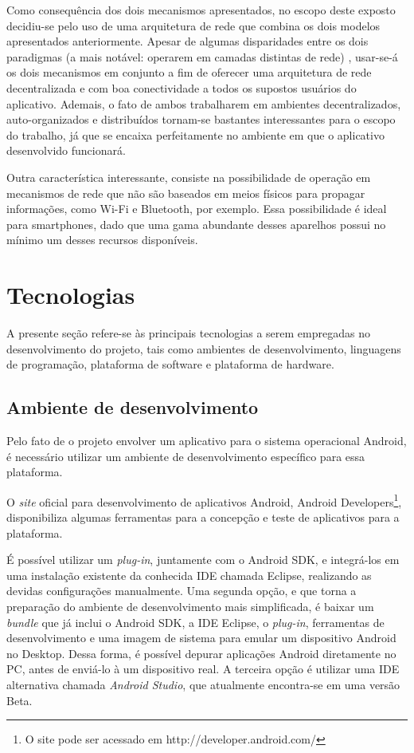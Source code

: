 Como consequência dos dois mecanismos apresentados, no escopo deste exposto decidiu-se pelo uso de uma arquitetura de rede que combina os dois modelos apresentados anteriormente. Apesar de algumas disparidades entre os dois paradigmas (a mais notável: operarem em camadas distintas de rede) \cite{italianos}, usar-se-á os dois mecanismos em conjunto a fim de oferecer uma arquitetura de rede decentralizada e com boa conectividade a todos os supostos usuários do aplicativo. Ademais, o fato de ambos trabalharem em ambientes decentralizados, auto-organizados e distribuídos \cite{italianos} tornam-se bastantes interessantes para o escopo do trabalho, já que se encaixa perfeitamente no ambiente em que o aplicativo desenvolvido funcionará. 

Outra característica interessante, consiste na possibilidade de operação em mecanismos de rede que não são baseados em meios físicos para propagar informações, como Wi-Fi e Bluetooth, por exemplo. Essa possibilidade é ideal para smartphones, dado que uma gama abundante desses aparelhos possui no mínimo um desses recursos disponíveis. 

\section{Tecnologias}\label{s:tecnologias}

A presente seção refere-se às principais tecnologias a serem empregadas no desenvolvimento do projeto, tais como ambientes de desenvolvimento, linguagens de programação, plataforma de software e plataforma de hardware.

\subsection{Ambiente de desenvolvimento}

Pelo fato de o projeto envolver um aplicativo para o sistema operacional Android, é necessário utilizar um ambiente de desenvolvimento específico para essa plataforma.

O \emph{site} oficial para desenvolvimento de aplicativos Android, Android Developers\footnote{O site pode ser acessado em http://developer.android.com/}, disponibiliza algumas ferramentas para a concepção e teste de aplicativos para a plataforma.

É possível utilizar um \emph{plug-in}, juntamente com o Android SDK, e integrá-los em uma instalação existente da conhecida IDE chamada Eclipse, realizando as devidas configurações manualmente. Uma segunda opção, e que torna a preparação do ambiente de desenvolvimento mais simplificada, é baixar um \emph{bundle} que já inclui o Android SDK, a IDE Eclipse, o \emph{plug-in}, ferramentas de desenvolvimento e uma imagem de sistema para emular um dispositivo Android no Desktop. Dessa forma, é possível depurar aplicações Android diretamente no PC, antes de enviá-lo à um dispositivo real. A terceira opção é utilizar uma IDE alternativa chamada \emph{Android Studio}, que atualmente encontra-se em uma versão Beta.

